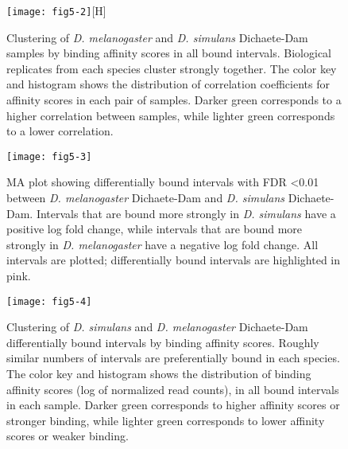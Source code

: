 \begin{figure}
\centering
\texttt{[image: fig5-2]}[H]
\caption[Clustering of \emph{D. melanogaster} and \emph{D. simulans} Dichaete-Dam samples by binding affinity scores in all bound intervals]{Clustering of \emph{D. melanogaster} and \emph{D. simulans} Dichaete-Dam samples by binding affinity scores in all bound intervals. Biological replicates from each species cluster strongly together. The color key and histogram shows the distribution of correlation coefficients for affinity scores in each pair of samples. Darker green corresponds to a higher correlation between samples, while lighter green corresponds to a lower correlation.}
\label{Figure 5.2}
\end{figure}

\begin{figure}
\centering
\texttt{[image: fig5-3]}
\caption[Differentially bound intervals with FDR \textless 0.01 between \emph{D. melanogaster} Dichaete-Dam and \emph{D. simulans} Dichaete-Dam]{MA plot showing differentially bound intervals with FDR \textless 0.01 between \emph{D. melanogaster} Dichaete-Dam and \emph{D. simulans} Dichaete-Dam. Intervals that are bound more strongly in \emph{D. simulans} have a positive log fold change, while intervals that are bound more strongly in \emph{D. melanogaster} have a negative log fold change. All intervals are plotted; differentially bound intervals are highlighted in pink.}
\label{Figure 5.3}
\end{figure}

\begin{figure}
\centering
\texttt{[image: fig5-4]}
\caption[Clustering of \emph{D. simulans} and \emph{D. melanogaster} Dichaete-Dam differentially bound intervals by binding affinity scores]{Clustering of \emph{D. simulans} and \emph{D. melanogaster} Dichaete-Dam differentially bound intervals by binding affinity scores. Roughly similar numbers of intervals are preferentially bound in each species. The color key and histogram shows the distribution of binding affinity scores (log of normalized read counts), in all bound intervals in each sample. Darker green corresponds to higher affinity scores or stronger binding, while lighter green corresponds to lower affinity scores or weaker binding.}
\label{Figure 5.4}
\end{figure}

